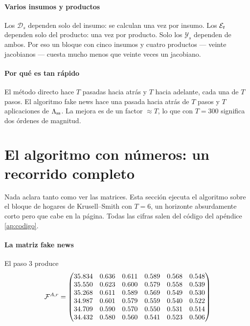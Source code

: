 \paragraph{Varios insumos y productos} Los $\mathcal{D}_s$ dependen solo del
insumo: se calculan una vez por insumo. Los $\mathcal{E}_t$ dependen solo del producto:
una vez por producto. Solo los $\mathcal{Y}_s$ dependen de ambos. Por eso un
bloque con cinco insumos y cuatro productos --- veinte jacobianos --- cuesta
mucho menos que veinte veces un jacobiano.

\paragraph{Por qué es tan rápido} El método directo hace $T$ pasadas hacia atrás
y $T$ hacia adelante, cada una de $T$ pasos. El algoritmo fake news hace una
pasada hacia atrás de $T$ pasos y $T$ aplicaciones de $\Lambda_{\mathrm{ss}}$. La mejora
es de un factor $\approx T$, lo que con $T=300$ significa dos órdenes de
magnitud.


\section{El algoritmo con números: un recorrido completo}

Nada aclara tanto como ver las matrices. Esta sección ejecuta el algoritmo sobre
el bloque de hogares de Krusell--Smith con $T=6$, un horizonte absurdamente corto
pero que cabe en la página. Todas las cifras salen del código del apéndice
\ref{ap:codigo}.

\paragraph{La matriz fake news} El paso 3 produce
\begin{equation}
\mathcal{F}^{A,r} =
\begin{pmatrix}
35.834 & 0.636 & 0.611 & 0.589 & 0.568 & 0.548 \\
35.550 & 0.623 & 0.600 & 0.579 & 0.558 & 0.539 \\
35.268 & 0.611 & 0.589 & 0.569 & 0.549 & 0.530 \\
34.987 & 0.601 & 0.579 & 0.559 & 0.540 & 0.522 \\
34.709 & 0.590 & 0.570 & 0.550 & 0.531 & 0.514 \\
34.432 & 0.580 & 0.560 & 0.541 & 0.523 & 0.506
\end{pmatrix}
\end{equation}

